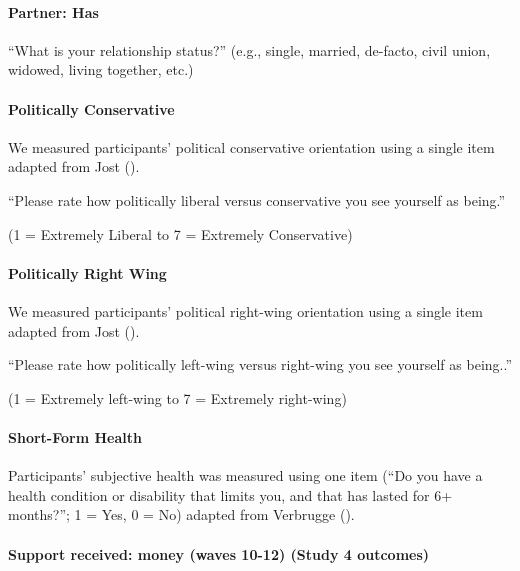 \documentclass[
  single column]{article}
\let\oldparagraph\paragraph
\renewcommand{\paragraph}[1]{\oldparagraph{#1}\mbox{}}
\begin{document}
\paragraph{Partner: Has}\label{partner-has}

``What is your relationship status?'' (e.g., single, married, de-facto,
civil union, widowed, living together, etc.)

\paragraph{Politically Conservative}\label{politically-conservative}

We measured participants' political conservative orientation using a
single item adapted from Jost ().

``Please rate how politically liberal versus conservative you see
yourself as being.''

(1 = Extremely Liberal to 7 = Extremely Conservative)

\paragraph{Politically Right Wing}\label{politically-right-wing}

We measured participants' political right-wing orientation using a
single item adapted from Jost ().

``Please rate how politically left-wing versus right-wing you see
yourself as being..''

(1 = Extremely left-wing to 7 = Extremely right-wing)

\paragraph{Short-Form Health}\label{short-form-health}

Participants' subjective health was measured using one item (``Do you
have a health condition or disability that limits you, and that has
lasted for 6+ months?''; 1 = Yes, 0 = No) adapted from Verbrugge
().

\paragraph{Support received: money (waves 10-12) (Study 4
outcomes)}\label{support-received-money-waves-10-12-study-4-outcomes}
\end{document}
